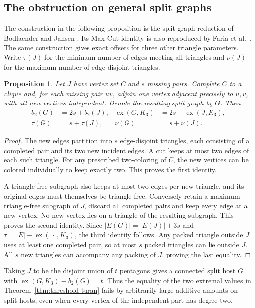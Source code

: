 \documentclass[11pt,a4paper]{article}
\newtheorem{proposition}[theorem]{Proposition}
\begin{document}
\subsection{The obstruction on general split graphs}
The construction in the following proposition is the split-graph reduction of Bodlaender and Jansen \cite{bjcut}. Its Max Cut identity is also reproduced by Faria et al.\ \cite[Theorem~5]{fariacut}. The same construction gives exact offsets for three other triangle parameters. Write $\tau(J)$ for the minimum number of edges meeting all triangles and $\nu(J)$ for the maximum number of edge-disjoint triangles.
\begin{proposition}\label{prop:split-offset}
Let $J$ have vertex set $C$ and $s$ missing pairs. Complete $C$ to a clique and, for each missing pair $uv$, adjoin one vertex adjacent precisely to $u,v$, with all new vertices independent. Denote the resulting split graph by $G$. Then
\begin{align*}
 b_2(G)&=2s+b_2(J),&
 \operatorname{ex}(G,K_3)&=2s+\operatorname{ex}(J,K_3),\\
 \tau(G)&=s+\tau(J),&
 \nu(G)&=s+\nu(J).
\end{align*}
\end{proposition}
\begin{proof}
The new edges partition into $s$ edge-disjoint triangles, each consisting of a completed pair and its two new incident edges. A cut keeps at most two edges of each such triangle. For any prescribed two-coloring of $C$, the new vertices can be colored individually to keep exactly two. This proves the first identity.

A triangle-free subgraph also keeps at most two edges per new triangle, and its original edges must themselves be triangle-free. Conversely retain a maximum triangle-free subgraph of $J$, discard all completed pairs and keep every edge at a new vertex. No new vertex lies on a triangle of the resulting subgraph. This proves the second identity. Since $|E(G)|=|E(J)|+3s$ and $\tau=|E|-\operatorname{ex}(\,\cdot\,,K_3)$, the third identity follows. Any packed triangle outside $J$ uses at least one completed pair, so at most $s$ packed triangles can lie outside $J$. All $s$ new triangles can accompany any packing of $J$, proving the last equality.
\end{proof}
Taking $J$ to be the disjoint union of $t$ pentagons gives a connected split host $G$ with $\operatorname{ex}(G,K_3)-b_2(G)=t$. Thus the equality of the two extremal values in Theorem~\ref{thm:threshold-turan} fails by arbitrarily large additive amounts on split hosts, even when every vertex of the independent part has degree two.
\end{document}
